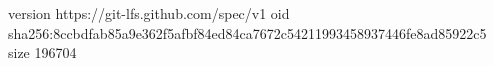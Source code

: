 version https://git-lfs.github.com/spec/v1
oid sha256:8ccbdfab85a9e362f5afbf84ed84ca7672c54211993458937446fe8ad85922c5
size 196704
